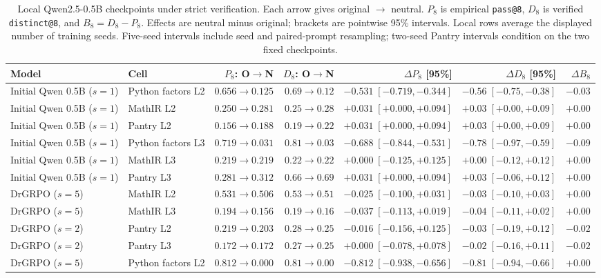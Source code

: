 \begin{table}[t]
\centering
\scriptsize
\setlength{\tabcolsep}{3pt}
\caption{Local Qwen2.5-0.5B checkpoints under strict verification. Each arrow gives original $\to$ neutral. $P_8$ is empirical \texttt{pass@8}, $D_8$ is verified \texttt{distinct@8}, and $B_8=D_8-P_8$. Effects are neutral minus original; brackets are pointwise 95\% intervals. Local rows average the displayed number of training seeds. Five-seed intervals include seed and paired-prompt resampling; two-seed Pantry intervals condition on the two fixed checkpoints. }
\label{tab:prompt-hints-local-strict}
\begin{tabular}{llrrrrr}
\toprule
Model & Cell & $P_8$: O$\to$N & $D_8$: O$\to$N & $\Delta P_8$ [95\%] & $\Delta D_8$ [95\%] & $\Delta B_8$ \\
\midrule
Initial Qwen 0.5B ($s=1$) & Python factors L2 & $0.656\to0.125$ & $0.69\to0.12$ & $-0.531\;[-0.719,-0.344]$ & $-0.56\;[-0.75,-0.38]$ & $-0.03$ \\
Initial Qwen 0.5B ($s=1$) & MathIR L2 & $0.250\to0.281$ & $0.25\to0.28$ & $+0.031\;[+0.000,+0.094]$ & $+0.03\;[+0.00,+0.09]$ & $+0.00$ \\
Initial Qwen 0.5B ($s=1$) & Pantry L2 & $0.156\to0.188$ & $0.19\to0.22$ & $+0.031\;[+0.000,+0.094]$ & $+0.03\;[+0.00,+0.09]$ & $+0.00$ \\
Initial Qwen 0.5B ($s=1$) & Python factors L3 & $0.719\to0.031$ & $0.81\to0.03$ & $-0.688\;[-0.844,-0.531]$ & $-0.78\;[-0.97,-0.59]$ & $-0.09$ \\
Initial Qwen 0.5B ($s=1$) & MathIR L3 & $0.219\to0.219$ & $0.22\to0.22$ & $+0.000\;[-0.125,+0.125]$ & $+0.00\;[-0.12,+0.12]$ & $+0.00$ \\
Initial Qwen 0.5B ($s=1$) & Pantry L3 & $0.281\to0.312$ & $0.66\to0.69$ & $+0.031\;[+0.000,+0.094]$ & $+0.03\;[-0.06,+0.12]$ & $+0.00$ \\
DrGRPO ($s=5$) & MathIR L2 & $0.531\to0.506$ & $0.53\to0.51$ & $-0.025\;[-0.100,+0.031]$ & $-0.03\;[-0.10,+0.03]$ & $+0.00$ \\
DrGRPO ($s=5$) & MathIR L3 & $0.194\to0.156$ & $0.19\to0.16$ & $-0.037\;[-0.113,+0.019]$ & $-0.04\;[-0.11,+0.02]$ & $+0.00$ \\
DrGRPO ($s=2$) & Pantry L2 & $0.219\to0.203$ & $0.28\to0.25$ & $-0.016\;[-0.156,+0.125]$ & $-0.03\;[-0.19,+0.12]$ & $-0.02$ \\
DrGRPO ($s=2$) & Pantry L3 & $0.172\to0.172$ & $0.27\to0.25$ & $+0.000\;[-0.078,+0.078]$ & $-0.02\;[-0.16,+0.11]$ & $-0.02$ \\
DrGRPO ($s=5$) & Python factors L2 & $0.812\to0.000$ & $0.81\to0.00$ & $-0.812\;[-0.938,-0.656]$ & $-0.81\;[-0.94,-0.66]$ & $+0.00$ \\

\end{tabular}
\end{table}
